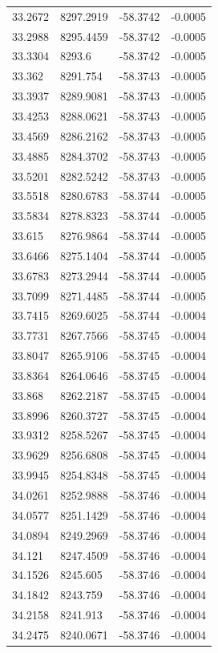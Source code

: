 \begin{table}[H]
\begin{tabular}{llll}
33.2672 & 8297.2919 & -58.3742 & -0.0005 \\
33.2988 & 8295.4459 & -58.3742 & -0.0005 \\
33.3304 & 8293.6 & -58.3742 & -0.0005 \\
33.362 & 8291.754 & -58.3743 & -0.0005 \\
33.3937 & 8289.9081 & -58.3743 & -0.0005 \\
33.4253 & 8288.0621 & -58.3743 & -0.0005 \\
33.4569 & 8286.2162 & -58.3743 & -0.0005 \\
33.4885 & 8284.3702 & -58.3743 & -0.0005 \\
33.5201 & 8282.5242 & -58.3743 & -0.0005 \\
33.5518 & 8280.6783 & -58.3744 & -0.0005 \\
33.5834 & 8278.8323 & -58.3744 & -0.0005 \\
33.615 & 8276.9864 & -58.3744 & -0.0005 \\
33.6466 & 8275.1404 & -58.3744 & -0.0005 \\
33.6783 & 8273.2944 & -58.3744 & -0.0005 \\
33.7099 & 8271.4485 & -58.3744 & -0.0005 \\
33.7415 & 8269.6025 & -58.3744 & -0.0004 \\
33.7731 & 8267.7566 & -58.3745 & -0.0004 \\
33.8047 & 8265.9106 & -58.3745 & -0.0004 \\
33.8364 & 8264.0646 & -58.3745 & -0.0004 \\
33.868 & 8262.2187 & -58.3745 & -0.0004 \\
33.8996 & 8260.3727 & -58.3745 & -0.0004 \\
33.9312 & 8258.5267 & -58.3745 & -0.0004 \\
33.9629 & 8256.6808 & -58.3745 & -0.0004 \\
33.9945 & 8254.8348 & -58.3745 & -0.0004 \\
34.0261 & 8252.9888 & -58.3746 & -0.0004 \\
34.0577 & 8251.1429 & -58.3746 & -0.0004 \\
34.0894 & 8249.2969 & -58.3746 & -0.0004 \\
34.121 & 8247.4509 & -58.3746 & -0.0004 \\
34.1526 & 8245.605 & -58.3746 & -0.0004 \\
34.1842 & 8243.759 & -58.3746 & -0.0004 \\
34.2158 & 8241.913 & -58.3746 & -0.0004 \\
34.2475 & 8240.0671 & -58.3746 & -0.0004 \\

\end{tabular}
\end{table}
